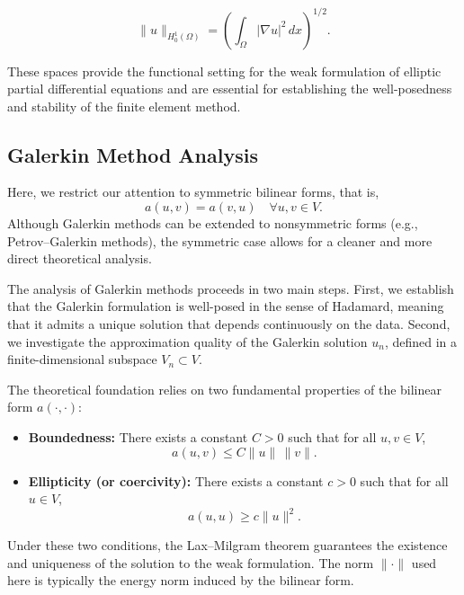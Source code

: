 \documentclass[12pt]{article}
\begin{document}
\begin{equation}
\| u \|_{H^1_0(\Omega)} = \left( \int_\Omega |\nabla u|^2 \, dx \right)^{1/2}.
\end{equation}

These spaces provide the functional setting for the weak formulation of elliptic partial differential equations and are essential for establishing the well-posedness and stability of the finite element method.

\subsection{Galerkin Method Analysis}

Here, we restrict our attention to symmetric bilinear forms, that is,
\begin{equation}
a(u, v) = a(v, u) \quad \forall u, v \in V.
\end{equation}
Although Galerkin methods can be extended to nonsymmetric forms (e.g., Petrov–Galerkin methods), the symmetric case allows for a cleaner and more direct theoretical analysis.

The analysis of Galerkin methods proceeds in two main steps. First, we establish that the Galerkin formulation is well-posed in the sense of Hadamard, meaning that it admits a unique solution that depends continuously on the data. Second, we investigate the approximation quality of the Galerkin solution \( u_n \), defined in a finite-dimensional subspace \( V_n \subset V \).

The theoretical foundation relies on two fundamental properties of the bilinear form \( a(\cdot, \cdot) \):

\begin{itemize}
    \item \textbf{Boundedness:} There exists a constant \( C > 0 \) such that for all \( u, v \in V \),
    \begin{equation}
    a(u, v) \leq C \| u \| \, \| v \|.
    \end{equation}
    
    \item \textbf{Ellipticity (or coercivity):} There exists a constant \( c > 0 \) such that for all \( u \in V \),
    \begin{equation}
    a(u, u) \geq c \| u \|^2.
    \end{equation}
\end{itemize}

Under these two conditions, the Lax–Milgram theorem guarantees the existence and uniqueness of the solution to the weak formulation. The norm \( \| \cdot \| \) used here is typically the energy norm induced by the bilinear form.
\end{document}
